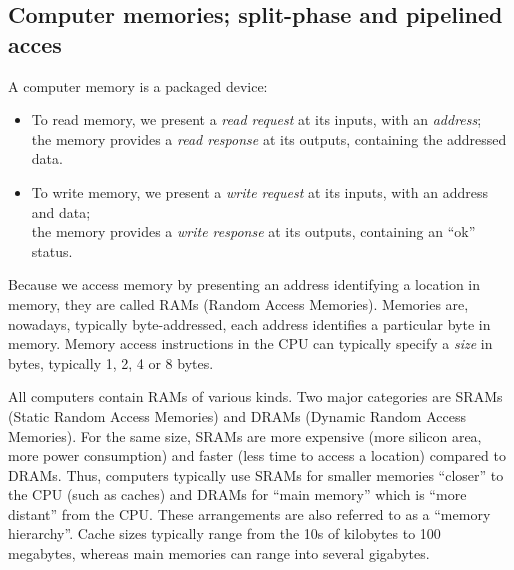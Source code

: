\vspace{1ex}



\subsection{Computer memories; split-phase and pipelined acces}

A computer memory is a packaged device:
\begin{itemize}

 \item To read memory, we present a \emph{read request} at its inputs,
       with an \emph{address}; \\
       the memory provides a \emph{read response} at its outputs,
       containing the addressed data.

 \item To write memory, we present a \emph{write request} at its
       inputs, with an address and data; \\
       the memory provides a \emph{write response} at its outputs,
       containing an ``ok'' status.

\end{itemize}


Because we access memory by presenting an address identifying a
location in memory, they are called RAMs (Random Access Memories).
Memories are, nowadays, typically byte-addressed, {\ie} each address
identifies a particular byte in memory.  Memory access instructions in
the CPU can typically specify a \emph{size} in bytes, typically 1, 2,
4 or 8 bytes.




All computers contain RAMs of various kinds.  Two major categories are
SRAMs (Static Random Access Memories) and DRAMs (Dynamic Random Access
Memories).  For the same size, SRAMs are more expensive (more silicon
area, more power consumption) and faster (less time to access a
location) compared to DRAMs.  Thus, computers typically use SRAMs for
smaller memories ``closer'' to the CPU (such as caches) and DRAMs for
``main memory'' which is ``more distant'' from the CPU.  These
arrangements are also referred to as a ``memory hierarchy''.  Cache
sizes typically range from the 10s of kilobytes to 100 megabytes,
whereas main memories can range into several gigabytes.

